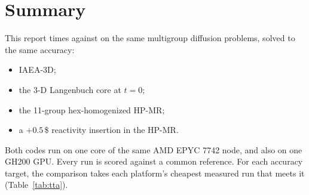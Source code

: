 \section*{Summary}

This report times \garnet{} against \ffn{} on the same multigroup diffusion
problems, solved to the same accuracy:
\begin{itemize}
\item IAEA-3D;
\item the 3-D Langenbuch core at $t=0$;
\item the 11-group hex-homogenized HP-MR;
\item a $+0.5$\,\$ reactivity insertion in the HP-MR.
\end{itemize}
Both codes run on one core of the same AMD EPYC 7742 node, and \garnet{}
also on one GH200 GPU. Every run is scored against a common reference. For
each accuracy target, the comparison takes each platform's cheapest
measured run that meets it (Table~\ref{tab:tta}).

